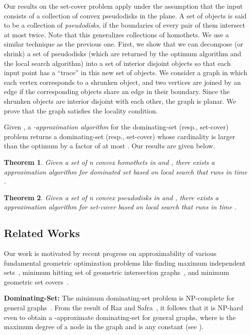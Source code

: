 \documentclass[a4paper,11pt]{article}
\newtheorem{theorem}{Theorem}
\begin{document}
{Our results on the set-cover problem apply under the assumption that the input consists of a collection of  convex pseudodisks in the plane.}  A set of objects is said to be a collection of \emph{pseudodisks}, if the boundaries of every pair of them intersect at most twice. Note that this generalizes collections of  homothets. We use a 
similar technique as the previous one. First, we show that we can decompose (or 
shrink) a set of  pseudodisks (which are returned by the optimum algorithm and the local search 
algorithm) into a set of interior disjoint  objects so that each input 
point has 
a ``trace'' in this new set of objects.
We consider a graph  in which each vertex corresponds to a {shrunken} 
object, and {two vertices are joined by an} edge if the corresponding objects share an edge 
in their boundary. Since the shrunken objects are interior disjoint with each 
other, the graph  is planar. We prove that the graph  
satisfies the locality condition. 



{Given , a \emph{-approximation algorithm} for the dominating-set (resp., set-cover) problem returns a dominating-set (resp., set-cover) whose cardinality is larger than the optimum by a factor of at most . Our results are given below.}

\begin{theorem}\label{Thm:DominatingSet}
{Given a set  of n convex homothets in  and , there exists a  approximation algorithm for dominated set based on local search that runs in time .}
\end{theorem} 
\begin{theorem}\label{Thm:SetCover}
{Given a set  of n convex pseudodisks in   and , there exists a  approximation algorithm for set-cover based on local search that runs in time .}
\end{theorem} 

\subsection{Related Works}

Our work is motivated by recent progress on approximability of various 
fundamental geometric optimization problems like finding maximum  independent 
sets~\cite{AdamaszekW14}, 
 minimum hitting set of geometric intersection graphs~\cite{MustafaR10}, and 
minimum geometric 
set 
covers~\cite{Ray}. 

{\bf Dominating-Set:} 
The minimum dominating-set problem is 
NP-complete for general graphs~\cite{GareyJ79}. From the result of Raz and 
Safra~\cite{RazS97}, it follows that it is NP-hard even to obtain {a} -approximate dominating-set for general graphs, where 
 is the maximum degree of a node in the graph and  is any 
constant 
(see \cite{LenzenW10}).  
\end{document}
